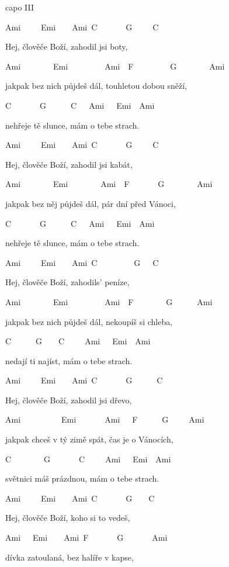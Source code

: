 capo III

\bigskip

Ami~~~~~Emi~~~~Ami~C~~~~~~~G~~~~~C 

Hej, člověče Boží, zahodil jsi boty, 

Ami~~~~~~~~Emi~~~~~~~~~Ami~~F~~~~~~~~~G~~~~~~~~Ami 

jakpak bez nich půjdeš dál, touhletou dobou sněží,

C~~~~~~~G~~~~~~C~~~Ami~~~Emi~~Ami

nehřeje tě slunce, mám o tebe strach.

\bigskip

Ami~~~~~Emi~~~~Ami~C~~~~~~~G~~~~~C 

Hej, člověče Boží, zahodil jsi kabát, 

Ami~~~~~~~~Emi~~~~~~~~Ami~~F~~~~~~~G~~~~~~~~Ami 

jakpak bez něj půjdeš dál, pár dní před Vánoci, 

C~~~~~~~G~~~~~~C~~~Ami~~~Emi~~Ami

nehřeje tě slunce, mám o tebe strach.

\bigskip

Ami~~~~~Emi~~~~Ami~C~~~~~~~~~G~~~C 

Hej, člověče Boží, zahodils' peníze, 

Ami~~~~~~~~Emi~~~~~~~~~Ami~~F~~~~~~~~G~~~~~~Ami 

jakpak bez nich půjdeš dál, nekoupíš si chleba, 

C~~~~~~G~~~~C~~~~~Ami~~~Emi~~Ami

nedají ti najíst, mám o tebe strach.

\bigskip

Ami~~~~~Emi~~~~Ami~C~~~~~~~G~~~~~~C 

Hej, člověče Boží, zahodil jsi dřevo, 

Ami~~~~~~~~~~Emi~~~~~~~Ami~~~F~~~~~~G~~~~~Ami 

jakpak chceš v tý zimě spát, čas je o Vánocích, 

C~~~~~~~~G~~~~~~~C~~~~~Ami~~~Emi~~Ami

světnici máš prázdnou, mám o tebe strach.

\bigskip

Ami~~~~~Emi~~~~Ami~C~~~~~~~G~~~~C 

Hej, člověče Boží, koho si to vedeš, 

Ami~~~Emi~~~~Ami~F~~~~~~~G~~~~~~~Ami 

dívka zatoulaná, bez halíře v kapse, 


